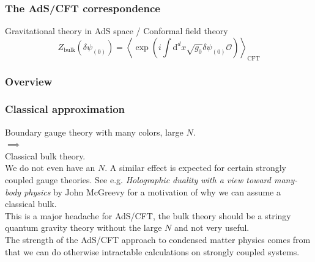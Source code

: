 \documentclass{beamer}
\renewcommand{\d}{\ensuremath{\mathrm{d}}}
\renewcommand{\i}{\ensuremath{i}}
\begin{document}
\begin{frame}
\frametitle{The AdS/CFT correspondence}
Gravitational theory in AdS space / Conformal field theory
\begin{equation}
 Z_{\mathrm{bulk}}(\delta\psi_{(0)})=\left\langle\exp(\i\int\d^dx\sqrt{g_0}\delta\psi_{(0)}\mathcal{O})\right\rangle_{\mathrm{CFT}}\label{fulCorr}
\end{equation}
\end{frame}

\begin{frame}
\frametitle{Overview}
\begin{figure}
 \centering
{}
\end{figure}
\end{frame}

\begin{frame}
\frametitle{Classical approximation}
Boundary gauge theory with many colors, large $N$.\\
$\implies$\\
Classical bulk theory.\\
\vspace{0.5cm}
We do not even have an $N$. A similar effect is expected for certain strongly coupled gauge theories. See e.g. \emph{Holographic duality with a view toward many-body physics} by John McGreevy for a motivation of why we can assume a classical bulk.\\
\vspace{0.5cm}
This is a major headache for AdS/CFT, the bulk theory should be a stringy quantum gravity theory without the large $N$ and not very useful.\\
\vspace{0.5cm}
The strength of the AdS/CFT approach to condensed matter physics comes from that we can do otherwise intractable calculations on strongly coupled systems.
\end{frame}
\end{document}
